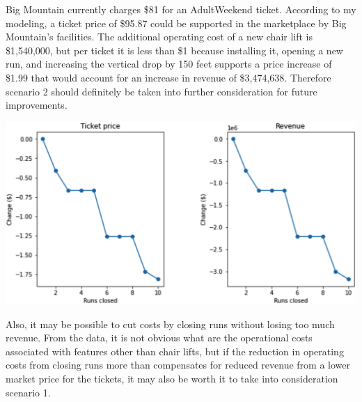 \documentclass[11pt]{article}
\begin{document}
Big Mountain currently charges \$81 for an AdultWeekend ticket. According to my modeling, a ticket price of \$95.87 could be supported in the marketplace
by Big Mountain's facilities. The additional operating cost of a new chair lift
is \$1,540,000, but per ticket it is less than \$1 because installing it,
opening a new run, and increasing the vertical drop by 150 feet supports
a price increase of \$1.99 that would account for an increase in revenue
of \$3,474,638. Therefore scenario 2 should definitely be taken into further
consideration for future improvements.
\begin{center}
\includegraphics[scale=.25]{effectofclosingrunsonmarketpriceandrevenue}
\end{center}
Also, it may be possible to cut costs by closing runs without losing too
much revenue. From the data, it is not obvious what are the operational
costs associated with features other than chair lifts, but if the reduction
in operating costs from closing runs more than compensates for reduced
revenue from a lower market price for the tickets, it may also be worth
it to take into consideration scenario 1.
\end{document}
